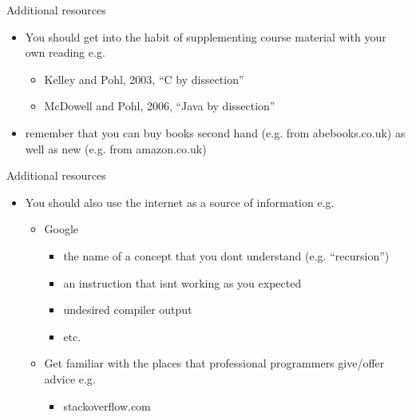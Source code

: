 \documentclass{beamer}
\begin{document}
\begin{frame}
Additional resources
\begin{itemize}
\item You should get into the habit of supplementing course material with your own reading e.g.
\begin{itemize}
\item Kelley and Pohl, 2003, ``C by dissection'' 
\item McDowell and Pohl, 2006, ``Java by dissection''
\end{itemize}
\item remember that you can buy books second hand (e.g. from abebooks.co.uk) as well as new (e.g. from amazon.co.uk)
\end{itemize}
\end{frame} 

\begin{frame}
Additional resources
\begin{itemize}
\item You should also use the internet as a source of information e.g.
\begin{itemize}
\item Google
\begin{itemize}
\item the name of a concept that you dont understand (e.g. ``recursion'')
\item an instruction that isnt working as you expected
\item undesired compiler output
\item etc.
\end{itemize}
\item Get familiar with the places that professional programmers give/offer advice e.g. 
\begin{itemize}
\item stackoverflow.com
\end{itemize}
\end{itemize}
\end{itemize}
\end{frame} 
\end{document}
